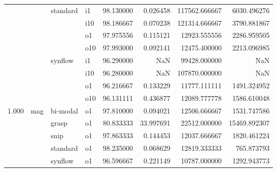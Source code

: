 \begin{longtable}{llllrrrr}
      &     & standard & i1 &  98.130000 &   0.026458 &    117562.666667 &   6030.496276 \\
      &     &         & i10 &  98.186667 &   0.070238 &    121314.666667 &   3790.881867 \\
      &     &         & o1 &  97.975556 &   0.115121 &     12923.555556 &   2286.959505 \\
      &     &         & o10 &  97.993000 &   0.092141 &     12475.400000 &   2213.096985 \\
      &     & synflow & i1 &  96.290000 &        NaN &     99428.000000 &           NaN \\
      &     &         & i10 &  96.280000 &        NaN &    107870.000000 &           NaN \\
      &     &         & o1 &  96.216667 &   0.133229 &     11777.111111 &   1491.324952 \\
      &     &         & o10 &  96.131111 &   0.436877 &     12089.777778 &   1586.610048 \\
1.000 & mag & bi-modal & o1 &  97.810000 &   0.094021 &     12506.666667 &   1531.747586 \\
      &     & grasp & o1 &  80.833333 &  33.997691 &     22512.000000 &  15469.892307 \\
      &     & snip & o1 &  97.863333 &   0.144453 &     12037.666667 &   1820.461224 \\
      &     & standard & o1 &  98.235000 &   0.068629 &     12819.333333 &    765.873793 \\
      &     & synflow & o1 &  96.596667 &   0.221149 &     10787.000000 &   1292.943773 \\
\end{longtable}
